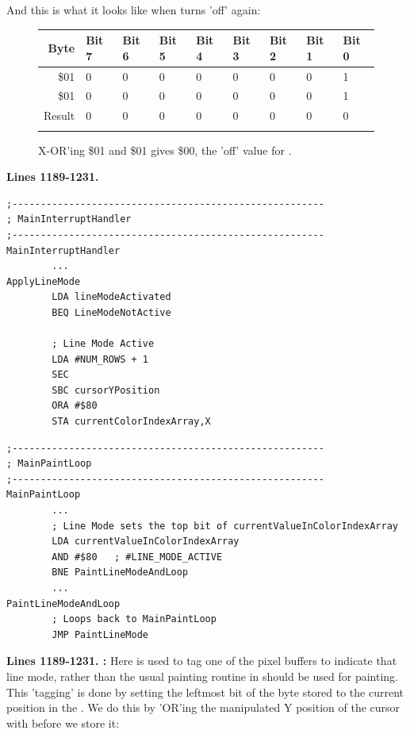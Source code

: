 And this is what it looks like when  turns  'off' again:
\begin{figure}[H]
  {
    \setlength{\tabcolsep}{3.0pt}
    \setlength\cmidrulewidth{\heavyrulewidth} %
    \begin{adjustbox}{width=7cm,center}

      \begin{tabular}{rllllllll}
        \toprule
        Byte & Bit 7 & Bit 6 & Bit 5 & Bit 4 & Bit 3 & Bit 2 & Bit 1 & Bit 0        \\
        \midrule
        \$01 & 0 & 0 & 0 & 0 & 0 & 0 & 0 & 1 \\
        \$01 & 0 & 0 & 0 & 0 & 0 & 0 & 0 & 1 \\
        \midrule
        Result & 0 & 0 & 0 & 0 & 0 & 0 & 0 & 0 \\
        \addlinespace
        \bottomrule
      \end{tabular}

    \end{adjustbox}

  }\caption*{X-OR'ing \$01 and \$01 gives \$00, the 'off' value for .}
\end{figure}
\clearpage

\textbf{Lines 1189-1231. } 
\begin{lstlisting}[caption=From \icode{MainInterruptHandler}.]
;-------------------------------------------------------
; MainInterruptHandler
;-------------------------------------------------------
MainInterruptHandler
        ...
ApplyLineMode
        LDA lineModeActivated
        BEQ LineModeNotActive

        ; Line Mode Active
        LDA #NUM_ROWS + 1
        SEC 
        SBC cursorYPosition
        ORA #$80
        STA currentColorIndexArray,X
\end{lstlisting}

\begin{lstlisting}[caption=From \icode{MainPaintLoop}.]
;-------------------------------------------------------
; MainPaintLoop
;-------------------------------------------------------
MainPaintLoop    
        ...
        ; Line Mode sets the top bit of currentValueInColorIndexArray
        LDA currentValueInColorIndexArray
        AND #$80   ; #LINE_MODE_ACTIVE
        BNE PaintLineModeAndLoop
        ...
PaintLineModeAndLoop
        ; Loops back to MainPaintLoop
        JMP PaintLineMode
\end{lstlisting}
\clearpage
\textbf{Lines 1189-1231. :} Here  is used
to tag one of the pixel buffers to indicate that line mode, rather than the usual painting routine
in  should be used for painting. This 'tagging'
is done by setting the leftmost bit of the byte stored to the current position in the 
. We do this by 'OR'ing the manipulated Y position of the cursor
with  before we store it:

